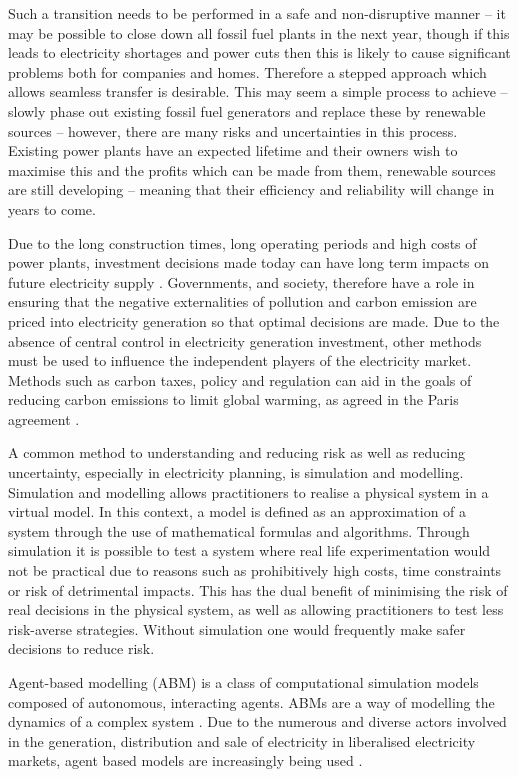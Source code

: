 Such a transition needs to be performed in a safe and non-disruptive manner -- it may be possible to close down all fossil fuel plants in the next year, though if this leads to electricity shortages and power cuts then this is likely to cause significant problems both for companies and homes. Therefore a stepped approach which allows seamless transfer is desirable. This may seem a simple process to achieve -- slowly phase out existing fossil fuel generators and replace these by renewable sources -- however, there are many risks and uncertainties in this process. Existing power plants have an expected lifetime and their owners wish to maximise this and the profits which can be made from them, renewable sources are still developing -- meaning that their efficiency and reliability will change in years to come.

Due to the long construction times, long operating periods and high costs of power plants, investment decisions made today can have long term impacts on future electricity supply \cite{Chappin2017}. Governments, and society, therefore have a role in ensuring that the negative externalities of pollution and carbon emission are priced into electricity generation so that optimal decisions are made. Due to the absence of central control in electricity generation investment, other methods must be used to influence the independent players of the electricity market. Methods such as carbon taxes, policy and regulation can aid in the goals of reducing carbon emissions to limit global warming, as agreed in the Paris agreement \cite{May2002}.

A common method to understanding and reducing risk as well as reducing uncertainty, especially in electricity planning, is simulation and modelling. Simulation and modelling allows practitioners to realise a physical system in a virtual model. In this context, a model is defined as an approximation of a system through the use of mathematical formulas and algorithms. Through simulation it is possible to test a system where real life experimentation would not be practical due to reasons such as prohibitively high costs, time constraints or risk of detrimental impacts. This has the dual benefit of minimising the risk of real decisions in the physical system, as well as allowing practitioners to test less risk-averse strategies. Without simulation one would frequently make safer decisions to reduce risk.

Agent-based modelling (ABM) is a class of computational simulation models composed of autonomous, interacting agents. ABMs are a way of modelling the dynamics of a complex system \cite{MacAl2010}. Due to the numerous and diverse actors involved in the generation, distribution and sale of electricity in liberalised electricity markets, agent based models are increasingly being used \cite{Zhou2007}.

